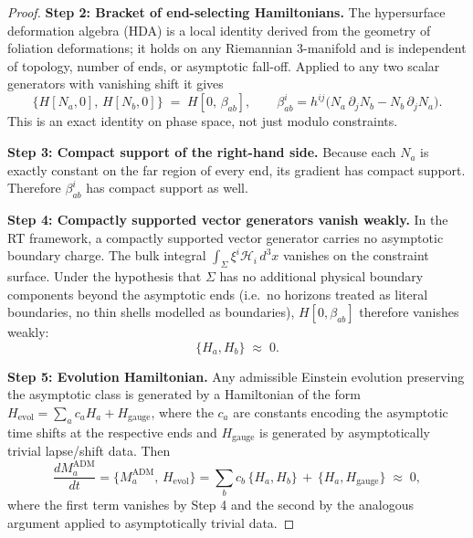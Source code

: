 \documentclass[aps,prd,onecolumn,nofootinbib,superscriptaddress]{revtex4-2}
\begin{document}
\begin{proof}
\textbf{Step 2: Bracket of end-selecting Hamiltonians.} The hypersurface deformation algebra (HDA) is a local identity derived from the geometry of foliation deformations; it holds on any Riemannian 3-manifold and is independent of topology, number of ends, or asymptotic fall-off.\cite{HojmanKucharTeitelboim1976Geometrodynamics} Applied to any two scalar generators with vanishing shift it gives
\begin{equation}
\label{eq:HDA}
\{H[N_a, 0],\, H[N_b, 0]\} \;=\; H[0,\, \beta_{ab}],
\qquad
\beta_{ab}^i = h^{ij}\big(N_a\, \partial_j N_b - N_b\, \partial_j N_a\big).
\end{equation}
This is an exact identity on phase space, not just modulo constraints.

\textbf{Step 3: Compact support of the right-hand side.} Because each $N_a$ is exactly constant on the far region of every end, its gradient has compact support. Therefore $\beta_{ab}^i$ has compact support as well.

\textbf{Step 4: Compactly supported vector generators vanish weakly.} In the RT framework, a compactly supported vector generator carries no asymptotic boundary charge. The bulk integral $\int_\Sigma \xi^i \mathcal{H}_i \, d^3x$ vanishes on the constraint surface. Under the hypothesis that $\Sigma$ has no additional physical boundary components beyond the asymptotic ends (i.e.\ no horizons treated as literal boundaries, no thin shells modelled as boundaries), $H[0, \beta_{ab}]$ therefore vanishes weakly:
\begin{equation}
\{H_a, H_b\} \;\approx\; 0.
\end{equation}

\textbf{Step 5: Evolution Hamiltonian.} Any admissible Einstein evolution preserving the asymptotic class is generated by a Hamiltonian of the form $H_{\mathrm{evol}} = \sum_a c_a H_a + H_{\mathrm{gauge}}$, where the $c_a$ are constants encoding the asymptotic time shifts at the respective ends and $H_{\mathrm{gauge}}$ is generated by asymptotically trivial lapse/shift data.\cite{ReggeTeitelboim1974SurfaceIntegrals} Then
\begin{equation}
\frac{dM_a^{\mathrm{ADM}}}{dt}
= \{M_a^{\mathrm{ADM}},\, H_{\mathrm{evol}}\}
= \sum_b c_b\, \{H_a, H_b\}\,+\,\{H_a, H_{\mathrm{gauge}}\}
\;\approx\; 0,
\end{equation}
where the first term vanishes by Step 4 and the second by the analogous argument applied to asymptotically trivial data.

\end{proof}
\end{document}
